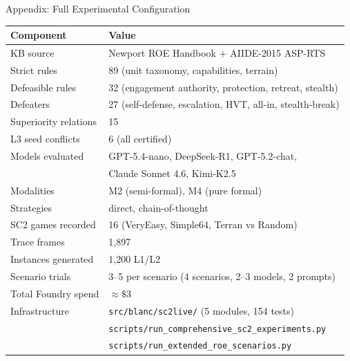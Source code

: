 \documentclass[aspectratio=169, 10pt]{beamer}
\begin{document}
\begin{frame}{Appendix: Full Experimental Configuration}
  \small
  \begin{tabular}{@{}ll@{}}
    \toprule
    \textbf{Component} & \textbf{Value} \\
    \midrule
    KB source & Newport ROE Handbook + AIIDE-2015 ASP-RTS \\
    Strict rules & 89 (unit taxonomy, capabilities, terrain) \\
    Defeasible rules & 32 (engagement authority, protection, retreat, stealth) \\
    Defeaters & 27 (self-defense, escalation, HVT, all-in, stealth-break) \\
    Superiority relations & 15 \\
    L3 seed conflicts & 6 (all certified) \\
    \midrule
    Models evaluated & GPT-5.4-nano, DeepSeek-R1, GPT-5.2-chat, \\
                     & Claude Sonnet 4.6, Kimi-K2.5 \\
    Modalities & M2 (semi-formal), M4 (pure formal) \\
    Strategies & direct, chain-of-thought \\
    \midrule
    SC2 games recorded & 16 (VeryEasy, Simple64, Terran vs Random) \\
    Trace frames & 1,897 \\
    Instances generated & 1,200 L1/L2 \\
    \midrule
    Scenario trials & 3--5 per scenario (4 scenarios, 2--3 models, 2 prompts) \\
    Total Foundry spend & $\approx\$3$ \\
    \midrule
    Infrastructure & \texttt{src/blanc/sc2live/} (5 modules, 154 tests) \\
                   & \texttt{scripts/run\_comprehensive\_sc2\_experiments.py} \\
                   & \texttt{scripts/run\_extended\_roe\_scenarios.py} \\
    \bottomrule
  \end{tabular}
\end{frame}
\end{document}
